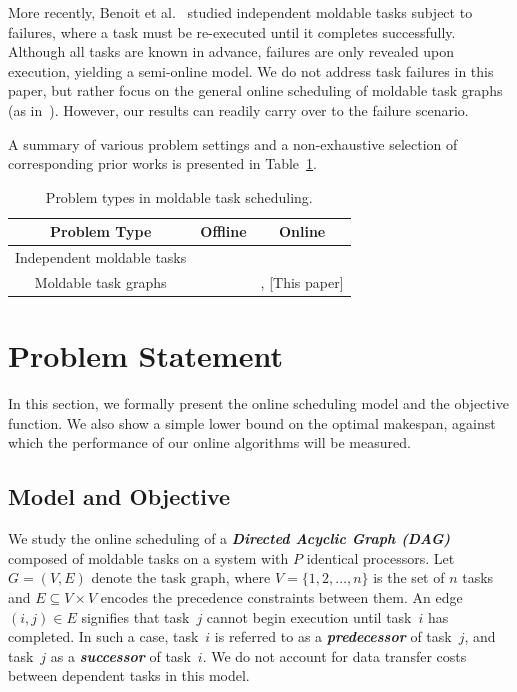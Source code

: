 \documentclass{article}
\begin{document}
More recently, Benoit et al.~\cite{Benoit20_cluster, Benoit21_ieeetc} studied independent moldable tasks subject to failures, where a task must be re-executed until it completes successfully. Although all tasks are known in advance, failures are only revealed upon execution, yielding a semi-online model. We do not address task failures in this paper, but rather focus on the general
online scheduling of moldable task graphs (as in~\cite{Feldmann98_DAG, ICPP22, TOPC24}). However, our results can readily carry over to the failure scenario.

A summary of various problem settings and a non-exhaustive selection of corresponding prior works is presented in Table~\ref{tab.references}.



\begin{table}[t]
\centering
\caption{Problem types in moldable task scheduling.}
\label{tab.references}
\begin{tabular}{|c|c|c|}
\hline
Problem Type & Offline & Online\\ \hline
Independent moldable tasks & \cite{Turek92,Jansen12_3over2,Jansen18_PTAS}& \cite{Ye18_online, Havill08_SET, Dutton07_ECT, Kell15_Improved}\\ \hline
Moldable task graphs & \cite{Wang92_DAG,Chen13_concave, Lepere01_DAG, Jansen06_DAG} & \cite{Feldmann98_DAG, ICPP22, TOPC24}, [This paper] \\ \hline
\end{tabular}
\end{table}

\section{Problem Statement}
\label{sec.pb}
In this section, we formally present the online scheduling model and the objective function. We also show a simple lower bound on the optimal makespan, against which the performance of our online algorithms will be measured.

\subsection{Model and Objective}
\label{sec.model}
We study the online scheduling of a \textbf{\emph{Directed Acyclic Graph (DAG)}} composed of moldable tasks on a system with $P$ identical processors. Let $G = (V, E)$ denote the task graph, where $V = \{1, 2, \dots, n\}$ is the set of $n$ tasks and $E \subseteq V \times V$ encodes the precedence constraints between them. An edge $(i, j) \in E$ signifies that task~$j$ cannot begin execution until task~$i$ has completed. In such a case, task~$i$ is referred to as a \textbf{\emph{predecessor}} of task~$j$, and task~$j$ as a \textbf{\emph{successor}} of task~$i$. We do not account for data transfer costs between dependent tasks in this model.
\end{document}
